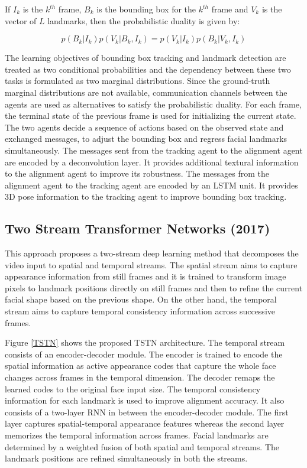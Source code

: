 \documentclass{llncs}
\begin{document}
If $I_k$ is the $k^{th}$ frame, $B_k$ is the bounding box for the $k^{th}$ frame and $V_k$ is the vector of $L$ landmarks, then the probabilistic duality is given by:  

\begin{equation}
p\left(B_{k} | I_{k}\right) p\left(V_{k} | B_{k}, I_{k}\right)=p\left(V_{k} | I_{k}\right) p\left(B_{k} | V_{k}, I_{k}\right)
\end{equation}



The learning objectives of bounding box tracking and landmark detection are treated as two conditional probabilities and the dependency between these two tasks is formulated as two marginal distributions. Since the ground-truth marginal distributions are not available, communication channels between the agents are used as alternatives to satisfy the probabilistic duality. For each frame, the terminal state of the previous frame is used for initializing the current state. The two agents decide a sequence of actions based on the observed state and exchanged messages, to adjust the bounding box and regress facial landmarks simultaneously. The messages sent from the tracking agent to the alignment agent are encoded by a deconvolution layer. It provides additional textural information to the alignment agent to improve its robustness. The messages from the alignment agent to the tracking agent are encoded by an LSTM unit. It provides 3D pose information to the tracking agent to improve bounding box tracking.

\subsection{Two Stream Transformer Networks (2017) \cite{tstn}}
This approach proposes a two-stream deep learning method that decomposes the video input to spatial and temporal streams. The spatial stream aims to capture appearance information from still frames and it is trained to transform image pixels to landmark positions directly on still frames and then to refine the current facial shape based on the previous shape. On the other hand, the temporal stream aims to capture temporal consistency information across successive frames. 

Figure \ref{TSTN} shows the proposed TSTN architecture. The temporal stream consists of an encoder-decoder module. The encoder is trained to encode the spatial information as active appearance codes that capture the whole face changes across frames in the temporal dimension. The decoder remaps the learned codes to the original face input size. The temporal consistency information for each landmark is used to improve alignment accuracy. It also consists of a two-layer RNN in between the encoder-decoder module. The first layer captures spatial-temporal appearance features whereas the second layer memorizes the temporal information across frames. Facial landmarks are determined by a weighted fusion of both spatial and temporal streams. The landmark positions are refined simultaneously in both the streams.
\end{document}

